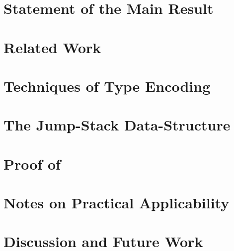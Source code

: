 \documentclass[a4paper,USenglish]{lipics}
\begin{document}
\section{Statement of the Main Result} 
\label{Section:result}


\section{Related Work}
\label{Section:related}


\section{Techniques of Type Encoding}
\label{Section:toolkit}


\section{The Jump-Stack Data-Structure}
\label{Section:jump}


\section{Proof of }
\label{Section:proof}


\section{Notes on Practical Applicability}
\label{Section:applicability}


\section{Discussion and Future Work}
\label{Section:zz}



\small

\end{document}
